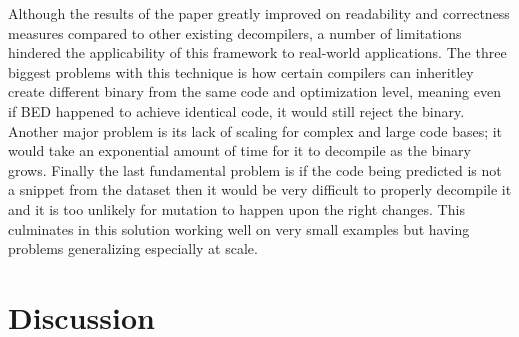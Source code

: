 \documentclass{article}
\begin{document}
Although the results of the paper greatly improved on readability and correctness measures compared to other existing decompilers, a number of limitations hindered the applicability of this framework to real-world applications.
The three biggest problems with this technique is how certain compilers can inheritley create different binary from the same code and optimization level, meaning even if BED happened to achieve identical code, it would still reject the binary.
Another major problem is its lack of scaling for complex and large code bases; it would take an exponential amount of time for it to decompile as the binary grows.
Finally the last fundamental problem is if the code being predicted is not a snippet from the dataset then it would be very difficult to properly decompile it and it is too unlikely for mutation to happen upon the right changes.
This culminates in this solution working well on very small examples but having problems generalizing especially at scale.



\section{Discussion}



\printbibliography
\end{document}

